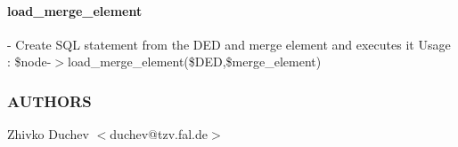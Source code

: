 \paragraph*{load\_merge\_element\label{load_merge_element}}


- Create SQL statement from the DED and merge element and executes it 
Usage : \$node-$>$load\_merge\_element(\$DED,\$merge\_element)

\subsubsection{AUTHORS\label{AUTHORS}}


Zhivko Duchev $<$duchev@tzv.fal.de$>$

